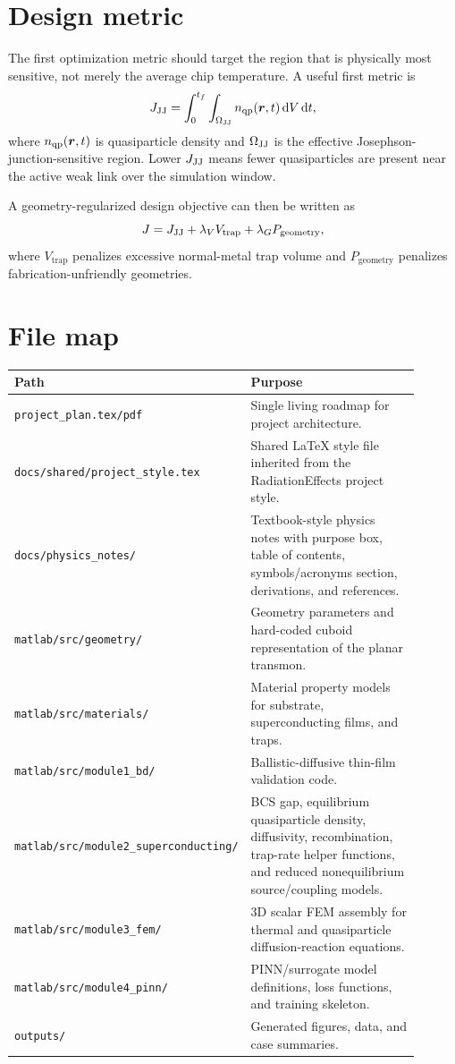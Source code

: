 \documentclass[11pt]{article}
\begin{document}
\section{Design metric}
The first optimization metric should target the region that is physically most sensitive, not merely the average chip temperature. A useful first metric is
\begin{equation}
J_{\mathrm{JJ}}=\int_0^{t_f}\int_{\Omega_{\mathrm{JJ}}} n_{\mathrm{qp}}(\bm{r},t)\,\dd V\,\dd t,
\end{equation}
where $n_{\mathrm{qp}}(\bm{r},t)$ is quasiparticle density and $\Omega_{\mathrm{JJ}}$ is the effective Josephson-junction-sensitive region. Lower $J_{\mathrm{JJ}}$ means fewer quasiparticles are present near the active weak link over the simulation window.

A geometry-regularized design objective can then be written as
\begin{equation}
J = J_{\mathrm{JJ}}+\lambda_V V_{\mathrm{trap}}+\lambda_G P_{\mathrm{geometry}},
\end{equation}
where $V_{\mathrm{trap}}$ penalizes excessive normal-metal trap volume and $P_{\mathrm{geometry}}$ penalizes fabrication-unfriendly geometries.

\section{File map}
{\footnotesize
\setlength{\tabcolsep}{4pt}
\begin{longtable}{>{\RaggedRight\arraybackslash}p{0.42\linewidth} >{\RaggedRight\arraybackslash}p{0.48\linewidth}}
\toprule
\textbf{Path} & \textbf{Purpose}\\
\midrule
\texttt{project\_plan.tex/pdf} & Single living roadmap for project architecture.\\
\texttt{docs/shared/project\_style.tex} & Shared LaTeX style file inherited from the RadiationEffects project style.\\
\texttt{docs/physics\_notes/} & Textbook-style physics notes with purpose box, table of contents, symbols/acronyms section, derivations, and references.\\
\texttt{matlab/src/geometry/} & Geometry parameters and hard-coded cuboid representation of the planar transmon.\\
\texttt{matlab/src/materials/} & Material property models for substrate, superconducting films, and traps.\\
\texttt{matlab/src/module1\_bd/} & Ballistic-diffusive thin-film validation code.\\
\texttt{matlab/src/module2\_superconducting/} & BCS gap, equilibrium quasiparticle density, diffusivity, recombination, trap-rate helper functions, and reduced nonequilibrium source/coupling models.\\
\texttt{matlab/src/module3\_fem/} & 3D scalar FEM assembly for thermal and quasiparticle diffusion-reaction equations.\\
\texttt{matlab/src/module4\_pinn/} & PINN/surrogate model definitions, loss functions, and training skeleton.\\
\texttt{outputs/} & Generated figures, data, and case summaries.\\
\bottomrule
\end{longtable}
}
\end{document}

